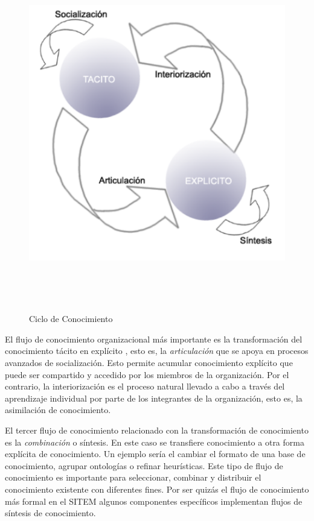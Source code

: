 \begin{figure}
 \centering
 \includegraphics[width=156mm, height=156mm]{Ciclo_Conocimiento.png}
 \caption{Ciclo de Conocimiento}
 \label{ciclo_conocimiento}
\end{figure}

El flujo de conocimiento organizacional más importante es la transformación del conocimiento tácito en explícito \cite{davies2011}, esto es, la \textit{articulación} que se apoya en procesos avanzados de socialización. Esto permite acumular conocimiento explícito que puede ser compartido y accedido por los miembros de la organización. Por el contrario, la interiorización es el proceso natural llevado a cabo a través del aprendizaje individual por parte de los integrantes de la organización, esto es, la asimilación de conocimiento. 

El tercer flujo de conocimiento relacionado con la transformación de conocimiento es la \textit{combinación} o síntesis. En este caso se transfiere conocimiento a otra forma explícita de conocimiento. Un ejemplo sería el cambiar el formato de una base de conocimiento, agrupar ontologías o refinar heurísticas. Este tipo de flujo de conocimiento es importante para seleccionar, combinar y distribuir el conocimiento existente con diferentes fines. Por ser quizás el flujo de conocimiento más formal en el SITEM algunos componentes específicos implementan flujos de síntesis de conocimiento.

